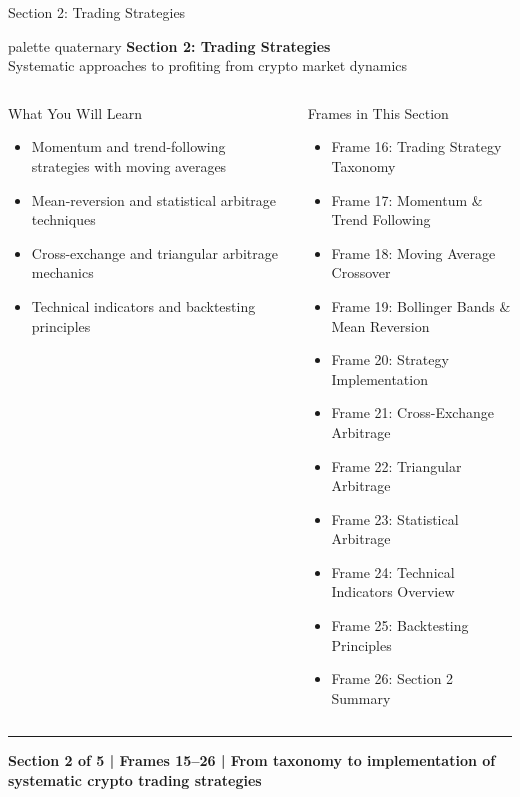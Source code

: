 \documentclass[8pt,aspectratio=169]{beamer}
\newcommand{\bottomnote}[1]{\vfill\vspace{-2mm}\textcolor{mllavender2}{\rule{\textwidth}{0.4pt}}\vspace{1mm}\footnotesize\textbf{#1}}
\begin{document}
\begin{frame}{Section 2: Trading Strategies}
\begin{beamercolorbox}[sep=12pt,center,rounded=true,shadow=true]{palette quaternary}
  {\Large\bfseries Section 2: Trading Strategies}\\[4pt]
  {\normalsize Systematic approaches to profiting from crypto market dynamics}
\end{beamercolorbox}

\vspace{4mm}
\begin{columns}[T]
\begin{block}{What You Will Learn}
\begin{itemize}\setlength{\itemsep}{2pt}
  \item Momentum and trend-following strategies with moving averages
  \item Mean-reversion and statistical arbitrage techniques
  \item Cross-exchange and triangular arbitrage mechanics
  \item Technical indicators and backtesting principles
\end{itemize}
\end{block}
\begin{block}{Frames in This Section}
\begin{itemize}\setlength{\itemsep}{2pt}
  \item Frame 16: Trading Strategy Taxonomy
  \item Frame 17: Momentum \& Trend Following
  \item Frame 18: Moving Average Crossover
  \item Frame 19: Bollinger Bands \& Mean Reversion
  \item Frame 20: Strategy Implementation
  \item Frame 21: Cross-Exchange Arbitrage
  \item Frame 22: Triangular Arbitrage
  \item Frame 23: Statistical Arbitrage
  \item Frame 24: Technical Indicators Overview
  \item Frame 25: Backtesting Principles
  \item Frame 26: Section 2 Summary
\end{itemize}
\end{block}
\end{columns}
\bottomnote{Section 2 of 5 | Frames 15--26 | From taxonomy to implementation of systematic crypto trading strategies}
\end{frame}
\end{document}
